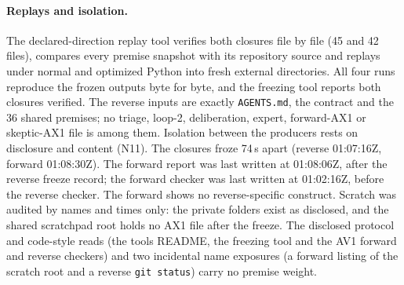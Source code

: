 \paragraph{Replays and isolation.}
The declared-direction replay tool verifies both closures file by file (45
and 42 files), compares every premise snapshot with its repository source and
replays under normal and optimized Python into fresh external directories.
All four runs reproduce the frozen outputs byte for byte, and the freezing
tool reports both closures verified. The reverse inputs are exactly
\texttt{AGENTS.md}, the contract and the 36 shared premises; no triage,
loop-2, deliberation, expert, forward-AX1 or skeptic-AX1 file is among them.
Isolation between the producers rests on disclosure and content (N11). The
closures froze 74\,s apart (reverse 01:07:16Z, forward 01:08:30Z). The
forward report was last written at 01:08:06Z, after the reverse freeze
record; the forward checker was last written at 01:02:16Z, before the
reverse checker. The forward shows no reverse-specific construct. Scratch was
audited by names and times only: the private folders exist as disclosed, and
the shared scratchpad root holds no AX1 file after the freeze. The disclosed
protocol and code-style reads (the tools README, the freezing tool and the
AV1 forward and reverse checkers) and two incidental name exposures (a
forward listing of the scratch root and a reverse \texttt{git status}) carry
no premise weight.

